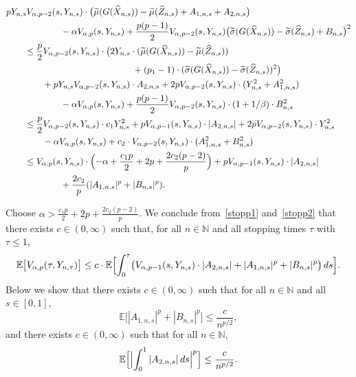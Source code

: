 \documentclass[11pt]{amsart}
\newcommand{\N}{{\mathbb N}}
\newcommand{\EE}{{\mathbb E}}
\newcommand{\eultr}{{\widehat Z}}
\theoremstyle{plain}
\theoremstyle{definition}
\begin{document}
\begin{equation}\label{stopp2}
	\begin{aligned}
& p Y_{n,s} V_{\alpha,p-2}(s,Y_{n,s})\cdot \bigl(\widetilde \mu(G(\widehat X_{n,s})) - \widetilde \mu(\eultr_{n,s})+ A_{1,n,s} + A_{2,n,s}\bigr) \\
& \qquad\qquad \qquad  -\alpha V_{\alpha,p}(s,Y_{n,s}) + \frac{p(p-1)}{2}   V_{\alpha,p-2}(s,Y_{n,s})\bigl( \widetilde \sigma(G(\widehat X_{n,s})) - \widetilde \sigma(\eultr_{n,s})+ B_{n,s}\bigr)^2	\\
& \qquad \le  \frac{p}{2}  V_{\alpha,p-2}(s,Y_{n,s})\cdot \bigl(2Y_{n,s}\cdot (\widetilde \mu(G(\widehat X_{n,s})) - \widetilde \mu(\eultr_{n,s}))\\
		& \qquad\qquad\qquad\qquad \qquad\qquad \qquad +(p_1-1) \cdot ( \widetilde \sigma(G(\widehat X_{n,s})) - \widetilde \sigma(\eultr_{n,s}))^2\bigr)\\
				& \qquad\qquad + p Y_{n,s} V_{\alpha,p-2}(s,Y_{n,s})\cdot  A_{2,n,s} + 2p V_{\alpha,p-2}(s,Y_{n,s})\cdot ( Y^2_{n,s} +  A^2_{1,n,s})\\
				& \qquad\qquad\qquad -\alpha V_{\alpha,p}(s,Y_{n,s}) + \frac{p(p-1)}{2}    V_{\alpha,p-2}(s,Y_{n,s})\cdot (1+1/\beta)\cdot B_{n,s}^2\\
				& \qquad \le  \frac{p}{2}  V_{\alpha,p-2}(s,Y_{n,s})\cdot c_1 Y_{n,s}^2+p V_{\alpha,p-1}(s,Y_{n,s})\cdot  |A_{2,n,s}| + 2p V_{\alpha,p-2}(s,Y_{n,s})\cdot Y_{n,s}^2 	\\
					& \qquad\qquad -\alpha V_{\alpha,p}(s,Y_{n,s})	+ c_2  \cdot V_{\alpha,p-2}(s,Y_{n,s})\cdot (A_{1,n,s}^2 + B_{n,s}^2)\\
							& \qquad \le   V_{\alpha,p}(s,Y_{n,s})\cdot\Bigl( -\alpha + \frac{c_1 p}{2} +2p+  \frac{2c_2(p-2)}{p}\Bigr)	+p  V_{\alpha,p-1}(s,Y_{n,s})\cdot  |A_{2,n,s}| \\
							& \qquad\qquad\qquad	+ \frac{2c_2}{p} (|A_{1,n,s}|^p+|B_{n,s}|^p).
	\end{aligned}
\end{equation}


Choose $\alpha > \frac{c_1 p}{2} +2p+  \frac{2c_2(p-2)}{p}$. We conclude from~\eqref{stopp1} and~\eqref{stopp2} that there exists $c\in (0,\infty)$ such that, for all $n\in\N$ and all stopping times $\tau$ with $\tau\le 1$,
 \begin{equation}\label{stopp3}
 		 \EE\bigl[ V_{\alpha,p}(\tau,Y_{n,\tau})\bigr] \le c \cdot \EE\Bigl[ \int_0^\tau \bigl(V_{\alpha,p-1}(s,Y_{n,s})\cdot  |A_{2,n,s}|+ |A_{1,n,s}|^p+|B_{n,s}|^p  \bigr)\, ds \Bigr].
 \end{equation}
Below we show that
there exists $c\in (0,\infty)$ such that for all $n\in\N$ and all $s\in [0,1]$,
 \begin{equation}\label{ana5}
	\EE\bigl[	|A_{1,n,s}|^p +	|B_{n,s}|^p\bigr]
		 \le\frac{c}{n^{p/2}},
\end{equation}	
and there exists $c\in (0,\infty)$ such that for all $n\in\N$,
\begin{equation}\label{eft3}
 \EE\Bigl[ \Bigl|	\int_0^1 |A_{2,n,s}|\, ds\Bigr|^p\Bigr]\le  \frac{c}{n^{p/2} }.
\end{equation}
\end{document}
